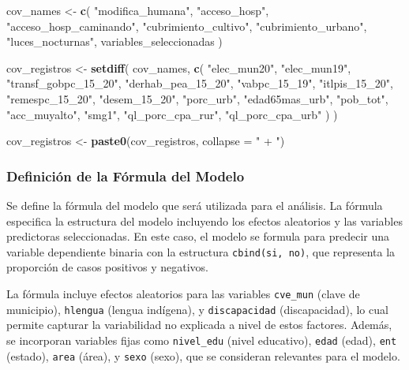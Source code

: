\documentclass[
  12pt,
]{book}
\newenvironment{Shaded}{\begin{snugshade}}{\end{snugshade}}
\newcommand{\AttributeTok}[1]{\textcolor[rgb]{0.13,0.29,0.53}{#1}}
\newcommand{\FunctionTok}[1]{\textcolor[rgb]{0.13,0.29,0.53}{\textbf{#1}}}
\newcommand{\NormalTok}[1]{#1}
\newcommand{\OtherTok}[1]{\textcolor[rgb]{0.56,0.35,0.01}{#1}}
\newcommand{\StringTok}[1]{\textcolor[rgb]{0.31,0.60,0.02}{#1}}
\begin{document}
\begin{Shaded}
\begin{Highlighting}[]
\NormalTok{cov\_names }\OtherTok{\textless{}{-}} \FunctionTok{c}\NormalTok{(}
  \StringTok{"modifica\_humana"}\NormalTok{,}
  \StringTok{"acceso\_hosp"}\NormalTok{,}
  \StringTok{"acceso\_hosp\_caminando"}\NormalTok{,}
  \StringTok{"cubrimiento\_cultivo"}\NormalTok{,}
  \StringTok{"cubrimiento\_urbano"}\NormalTok{,}
  \StringTok{"luces\_nocturnas"}\NormalTok{,}
\NormalTok{  variables\_seleccionadas}
\NormalTok{)}

\NormalTok{cov\_registros }\OtherTok{\textless{}{-}}
  \FunctionTok{setdiff}\NormalTok{(}
\NormalTok{    cov\_names,}
    \FunctionTok{c}\NormalTok{(}
      \StringTok{"elec\_mun20"}\NormalTok{,}
      \StringTok{"elec\_mun19"}\NormalTok{,}
      \StringTok{"transf\_gobpc\_15\_20"}\NormalTok{,}
      \StringTok{"derhab\_pea\_15\_20"}\NormalTok{,}
      \StringTok{"vabpc\_15\_19"}\NormalTok{,}
      \StringTok{"itlpis\_15\_20"}\NormalTok{,}
      \StringTok{"remespc\_15\_20"}\NormalTok{,}
      \StringTok{"desem\_15\_20"}\NormalTok{,}
      \StringTok{"porc\_urb"}\NormalTok{,}
      \StringTok{"edad65mas\_urb"}\NormalTok{,}
      \StringTok{"pob\_tot"}\NormalTok{,}
      \StringTok{"acc\_muyalto"}\NormalTok{,}
      \StringTok{"smg1"}\NormalTok{,}
      \StringTok{"ql\_porc\_cpa\_rur"}\NormalTok{,}
      \StringTok{"ql\_porc\_cpa\_urb"}
\NormalTok{    )}
\NormalTok{  )}

\NormalTok{cov\_registros }\OtherTok{\textless{}{-}} \FunctionTok{paste0}\NormalTok{(cov\_registros, }\AttributeTok{collapse =} \StringTok{" + "}\NormalTok{)}
\end{Highlighting}
\end{Shaded}

\hypertarget{definiciuxf3n-de-la-fuxf3rmula-del-modelo-1}{%
\subsubsection*{Definición de la Fórmula del Modelo}\label{definiciuxf3n-de-la-fuxf3rmula-del-modelo-1}}

Se define la fórmula del modelo que será utilizada para el análisis. La fórmula especifica la estructura del modelo incluyendo los efectos aleatorios y las variables predictoras seleccionadas. En este caso, el modelo se formula para predecir una variable dependiente binaria con la estructura \texttt{cbind(si,\ no)}, que representa la proporción de casos positivos y negativos.

La fórmula incluye efectos aleatorios para las variables \texttt{cve\_mun} (clave de municipio), \texttt{hlengua} (lengua indígena), y \texttt{discapacidad} (discapacidad), lo cual permite capturar la variabilidad no explicada a nivel de estos factores. Además, se incorporan variables fijas como \texttt{nivel\_edu} (nivel educativo), \texttt{edad} (edad), \texttt{ent} (estado), \texttt{area} (área), y \texttt{sexo} (sexo), que se consideran relevantes para el modelo.
\end{document}
